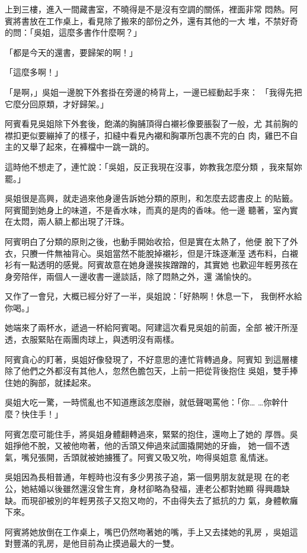 上到三樓，進入一間藏書室，不曉得是不是沒有空調的關係，裡面非常
悶熱。阿賓將書放在工作桌上，看見除了搬來的部份之外，還有其他的一大
堆，不禁好奇的問：「吳姐，這麼多書作什麼啊？」

「都是今天的還書，要歸架的啊！」

「這麼多啊！」

「是啊，」吳姐一邊脫下外套掛在旁邊的椅背上，一邊已經動起手來：
「我得先把它麼分回原類，才好歸架。」

阿賓看見吳姐除下外套後，飽滿的胸脯頂得白襯衫像要脹裂了一般，尤
其前胸的襟扣更似要繃掉了的樣子，扣縫中看見內襯和胸罩所包裹不完的白
肉，雞巴不自主的又舉了起來，在褲檔中一跳一跳的。

這時他不想走了，連忙說：「吳姐，反正我現在沒事，妳教我怎麼分類
，我來幫妳罷。」

吳姐很是高興，就走過來他身邊告訴她分類的原則，和怎麼去認書皮上
的貼籤。阿賓聞到她身上的味道，不是香水味，而真的是肉的香味。他一邊
聽著，室內實在太悶，兩人額上都出現了汗珠。

阿賓明白了分類的原則之後，也動手開始收拾，但是實在太熱了，他便
脫下了外衣，只賸一件無袖背心。吳姐當然不能脫掉襯衫，但是汗珠逐漸溼
透布料，白襯衫有一點透明的感覺。阿賓故意在她身邊挨挨蹭蹭的，其實她
也歡迎年輕男孩在身旁陪伴，兩個人一邊收書一邊談話，除了悶熱之外，還
滿愉快的。

又作了一會兒，大概已經分好了一半，吳姐說：「好熱啊！休息一下，
我倒杯水給你喝。」

她端來了兩杯水，遞過一杯給阿賓喝。阿建這次看見吳姐的前面，全部
被汗所溼透，衣服緊貼在兩團肉球上，與透明沒有兩樣。

阿賓貪心的盯著，吳姐好像發現了，不好意思的連忙背轉過身。阿賓知
到這層樓除了他們之外都沒有其他人，忽然色膽包天，上前一把從背後抱住
吳姐，雙手捧住她的胸部，就揉起來。

吳姐大吃一驚，一時慌亂也不知道應該怎麼辦，就低聲喝罵他：「你…
…你幹什麼？快住手！」

阿賓怎麼可能住手，將吳姐身體翻轉過來，緊緊的抱住，還吻上了她的
厚唇。吳姐掙他不脫，又被他吻著，他的舌頭又伸過來試圖撬開她的牙齒，
她一個不透氣，嘴兒張開，舌頭就被她擄獲了。阿賓又吸又吮，吻得吳姐意
亂情迷。

吳姐因為長相普通，年輕時也沒有多少男孩子追，第一個男朋友就是現
在的老公，她結婚以後雖然還沒曾生育，身材卻略為發福，連老公都對她顯
得興趣缺缺。而現卻被別的年輕男孩子又抱又吻的，不由得失去了抵抗的力
氣，身體軟癱下來。

阿賓將她放倒在工作桌上，嘴巴仍然吻著她的嘴，手上又去揉她的乳房
，吳姐這對豐滿的乳房，是他目前為止摸過最大的一雙。


